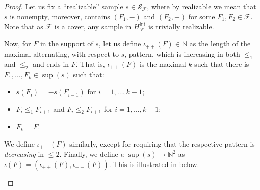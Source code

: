 \documentclass{article} %
\newcommand{\N}{\mathbb{N}}
\newcommand{\F}{\mathcal{F}}
\renewcommand{\S}{\mathcal{S}}
\newcommand{\intr}{\mathrm{int}}
\begin{document}
\begin{proof}
	Let us fix a ``realizable'' sample $s\in \S_\F$, where by realizable we mean that $s$ is nonempty, moreover, contains $(F_1, -)$ and $(F_2, +)$ for some $F_1, F_2\in \F$. Note that as $\F$ is a cover, any sample in $H^\intr_\F$ is trivially realizable. 
	 
	Now, for $F$ in the support of $s$, let us define $\iota_{++}(F) \in \N$ as the length of the maximal alternating, with respect to $s$, pattern, which is increasing in both $\leq_1$ and $\leq_2$ and ends in $F$. That is, $\iota_{++}(F)$ is the maximal $k$ such that there is $F_1, \dots, F_k \in \sup(s)$ such that:
	\begin{itemize}
		\item $s(F_i) = -s(F_{i-1})$ for $i=1, \dots, k-1$;
		\item $F_i \leq_1 F_{i+1}$ and $F_i \leq_2 F_{i+1}$  for $i=1, \dots, k-1$;
		\item $F_k = F$.
	\end{itemize}
	
	We define $\iota_{+-}(F)$ similarly, except for requiring that the respective pattern is \emph{decreasing} in $\leq 2$. Finally, we define $\iota \colon \sup (s) \rightarrow \N^2$ as $\iota(F) = \left(\iota_{++}(F), \iota_{+-}(F)\right)$. This is illustrated in  below.
	
	\begin{figure}[hbt]
	\centering
{}
\end{figure}
\end{proof}
\end{document}
